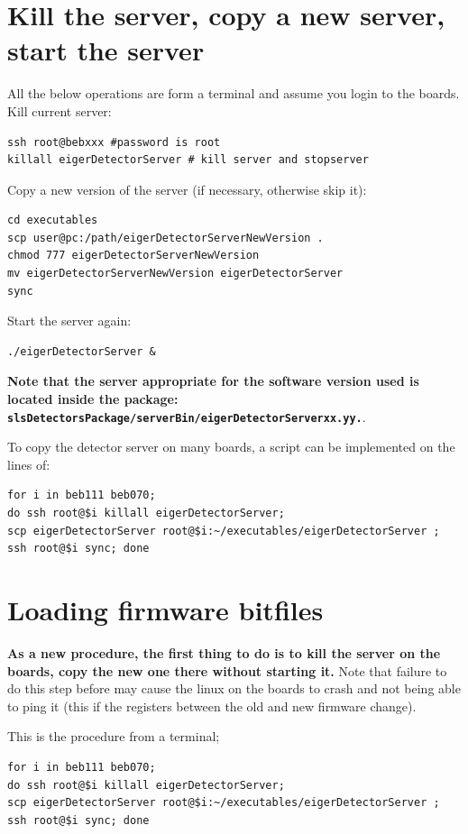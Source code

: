 \documentclass{article}
\begin{document}
\section{Kill the server, copy a new server, start the server}\label{server}
All the below operations are form a terminal and assume you login to the boards.\\
Kill current server:
\begin{verbatim}
ssh root@bebxxx #password is root
killall eigerDetectorServer # kill server and stopserver
\end{verbatim}
Copy a new version of the server (if necessary, otherwise skip it):
\begin{verbatim}
cd executables
scp user@pc:/path/eigerDetectorServerNewVersion .
chmod 777 eigerDetectorServerNewVersion
mv eigerDetectorServerNewVersion eigerDetectorServer
sync
\end{verbatim}
Start the server again:
\begin{verbatim}
./eigerDetectorServer &
\end{verbatim}
\textbf{Note that the server appropriate for the software version used is located inside the package: {\tt{slsDetectorsPackage/serverBin/eigerDetectorServerxx.yy.}}}.

To copy the detector server on many boards, a script can be implemented on the lines of:
\begin{verbatim}
for i in beb111 beb070; 
do ssh root@$i killall eigerDetectorServer; 
scp eigerDetectorServer root@$i:~/executables/eigerDetectorServer ; 
ssh root@$i sync; done
\end{verbatim}

\section{Loading firmware bitfiles}

\textbf{As a new procedure, the first thing to do is to kill the server on the boards, copy the new one there without starting it.} Note that failure to do this step before may cause the linux on the boards to crash and not being able to ping it (this if the registers between the old and new firmware change).

This is the procedure from a terminal;
\begin{verbatim}
for i in beb111 beb070; 
do ssh root@$i killall eigerDetectorServer; 
scp eigerDetectorServer root@$i:~/executables/eigerDetectorServer ; 
ssh root@$i sync; done
\end{verbatim}
\end{document}
